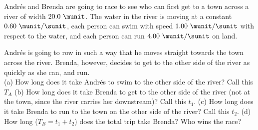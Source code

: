 Andr\'es and Brenda are going to race to see who can first get to a
town across a river of width $20.0\ \munit$. The water in the river is
moving at a constant $0.60\ \munit/\sunit$, each person can swim with
speed $1.00\ \munit/\sunit$ with respect to the water, and each
person can run $4.00\ \munit/\sunit$ on land.

Andr\'es is going to row in such a way that he moves straight towards
the town across the river. Brenda, however, decides to get to the
other side of the river as quickly as she can, and run.\\
%
(a) How long does it take Andr\'es to swim to the other side of the
river? Call this $T_A$\answercheck\hwendpart
%
(b) How long does it take Brenda to get to the other side of the river
(not at the town, since the river carries her downstream)? Call this
$t_1$.\answercheck\hwendpart
%
(c) How long does it take Brenda to run to the town on the other side
of the river? Call this $t_2$.\answercheck\hwendpart
%
(d) How long ($T_B = t_1 + t_2$) does the total trip take Brenda? Who
wins the race?\answercheck
